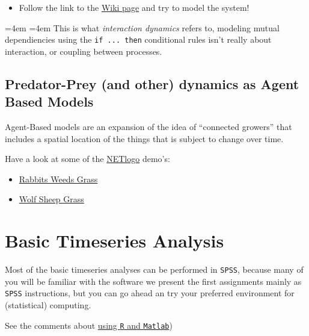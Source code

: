 \documentclass[]{book}
\providecommand{\tightlist}{%
  \setlength{\itemsep}{0pt}\setlength{\parskip}{0pt}}
\renewenvironment{quote}{%
  \par \small \medskip \block
  \leftskip=4em \rightskip=4em%
  \noindent \ignorespaces}{%
  \par \medskip
  }
\let\stdsection\section
\renewcommand\section{\newpage\stdsection}
\let\BeginKnitrBlock\begin \let\EndKnitrBlock\end
\begin{document}
\begin{itemize}
\tightlist
\item
  Follow the link to the
  \href{https://en.wikipedia.org/wiki/Competitive_Lotka???Volterra_equations}{Wiki
  page} and try to model the system!
\end{itemize}

\begin{quote}
This is what \emph{interaction dynamics} refers to, modeling mutual
dependiencies using the \texttt{if\ ...\ then} conditional rules isn't
really about interaction, or coupling between processes.
\end{quote}

\section{Predator-Prey (and other) dynamics as Agent Based
Models}\label{predator-prey-and-other-dynamics-as-agent-based-models}

Agent-Based models are an expansion of the idea of ``connected growers''
that includes a spatial location of the things that is subject to change
over time.

Have a look at some of the
\href{http://ccl.northwestern.edu/netlogo/}{NETlogo} demo's:

\begin{itemize}
\tightlist
\item
  \href{http://www.netlogoweb.org/launch\#http://www.netlogoweb.org/assets/modelslib/Sample\%20Models/Biology/Rabbits\%20Grass\%20Weeds.nlogo}{Rabbits
  Weeds Grass}
\item
  \href{http://www.netlogoweb.org/launch\#http://www.netlogoweb.org/assets/modelslib/Sample\%20Models/Biology/Wolf\%20Sheep\%20Predation.nlogo}{Wolf
  Sheep Grass}
\end{itemize}

\chapter{\texorpdfstring{\textbf{Basic Timeseries
Analysis}}{Basic Timeseries Analysis}}\label{basic-timeseries-analysis}

Most of the basic timeseries analyses can be performed in \texttt{SPSS},
because many of you will be familiar with the software we present the
first assignments mainly as \texttt{SPSS} instructions, but you can go
ahead an try your preferred environment for (statistical) computing.

\BeginKnitrBlock{rmdimportant}
See the comments about \protect\hyperlink{bTSAinR}{using \texttt{R} and
\texttt{Matlab}})
\EndKnitrBlock{rmdimportant}
\end{document}
